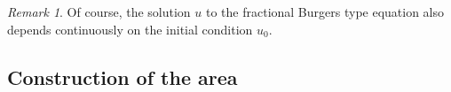 \documentclass[a4paper,11pt]{article}
\newcommand{\cdummy}{\cdot}
\theoremstyle{remark}
\newtheorem{remark}[theorem]{Remark}
\newcommand{\CC}{\ensuremath{\mathscr{C}}}
\newcommand{\reso}{\,\mathord{\circ}\,}
\begin{document}

\begin{remark}
   Of course, the solution $u$ to the fractional Burgers type equation also depends continuously on the initial condition $u_0$.
\end{remark}






\subsection{Construction of the area}
\end{document}
